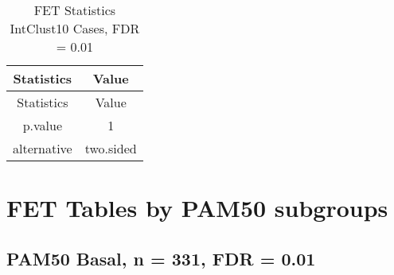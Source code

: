 \documentclass[]{article}
\begin{document}
\begin{longtable}[]{@{}cc@{}}
\caption{FET Statistics IntClust10 Cases, FDR = 0.01}\tabularnewline
\toprule
\begin{minipage}[b]{0.18\columnwidth}\centering\strut
Statistics\strut
\end{minipage} & \begin{minipage}[b]{0.14\columnwidth}\centering\strut
Value\strut
\end{minipage}\tabularnewline
\midrule
\endfirsthead
\toprule
\begin{minipage}[b]{0.18\columnwidth}\centering\strut
Statistics\strut
\end{minipage} & \begin{minipage}[b]{0.14\columnwidth}\centering\strut
Value\strut
\end{minipage}\tabularnewline
\midrule
\endhead
\begin{minipage}[t]{0.18\columnwidth}\centering\strut
p.value\strut
\end{minipage} & \begin{minipage}[t]{0.14\columnwidth}\centering\strut
1\strut
\end{minipage}\tabularnewline
\begin{minipage}[t]{0.18\columnwidth}\centering\strut
alternative\strut
\end{minipage} & \begin{minipage}[t]{0.14\columnwidth}\centering\strut
two.sided\strut
\end{minipage}\tabularnewline
\bottomrule
\end{longtable}

\pagebreak

\section{FET Tables by PAM50
subgroups}\label{fet-tables-by-pam50-subgroups}

\subsection{PAM50 Basal, n = 331, FDR =
0.01}\label{pam50-basal-n-331-fdr-0.01}
\end{document}
